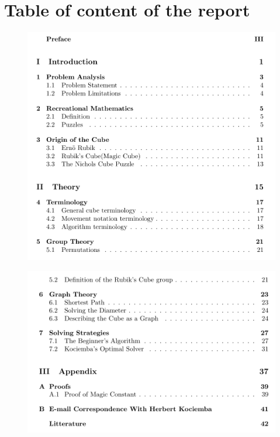 \documentclass{article}
\begin{document}
\tableofcontents

\ \pagebreak{}
\section{Table of content of the report}



\begin{figure}[hp]
	\centering
		\includegraphics[scale = 0.7]{toc1.pdf}
		\label{fig:toc1}
\end{figure}
\begin{figure}
	\centering
		\includegraphics[scale = 0.7]{toc2.pdf}
	
	\label{fig:toc2}
\end{figure}
\end{document}
